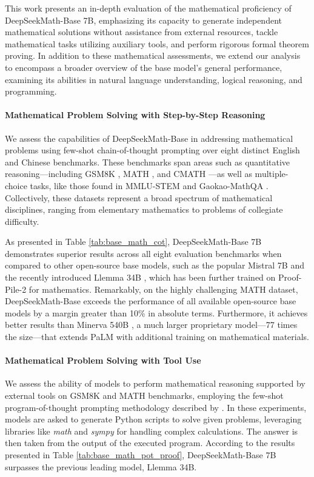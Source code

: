 \begin{itemize}[topsep=0pt]
This work presents an in-depth evaluation of the mathematical proficiency of DeepSeekMath-Base 7B, emphasizing its capacity to generate independent mathematical solutions without assistance from external resources, tackle mathematical tasks utilizing auxiliary tools, and perform rigorous formal theorem proving. In addition to these mathematical assessments, we extend our analysis to encompass a broader overview of the base model’s general performance, examining its abilities in natural language understanding, logical reasoning, and programming.

\paragraph{Mathematical Problem Solving with Step-by-Step Reasoning}

We assess the capabilities of DeepSeekMath-Base in addressing mathematical problems using few-shot chain-of-thought prompting \citep{cot} over eight distinct English and Chinese benchmarks. These benchmarks span areas such as quantitative reasoning—including GSM8K \citep{gsm8k}, MATH \citep{MATH}, and CMATH \citep{wei2023cmath}—as well as multiple-choice tasks, like those found in MMLU-STEM \citep{mmlu} and Gaokao-MathQA \citep{agieval}. Collectively, these datasets represent a broad spectrum of mathematical disciplines, ranging from elementary mathematics to problems of collegiate difficulty.

As presented in Table \ref{tab:base_math_cot}, DeepSeekMath-Base 7B demonstrates superior results across all eight evaluation benchmarks when compared to other open-source base models, such as the popular Mistral 7B \citep{mistral} and the recently introduced Llemma 34B \citep{llemma}, which has been further trained on Proof-Pile-2 \citep{llemma} for mathematics. Remarkably, on the highly challenging MATH dataset, DeepSeekMath-Base exceeds the performance of all available open-source base models by a margin greater than 10\% in absolute terms. Furthermore, it achieves better results than Minerva 540B \citep{minerva}, a much larger proprietary model—77 times the size—that extends PaLM \citep{palm} with additional training on mathematical materials.

\paragraph{Mathematical Problem Solving with Tool Use} We assess the ability of models to perform mathematical reasoning supported by external tools on GSM8K and MATH benchmarks, employing the few-shot program-of-thought prompting methodology described by \citet{pot,pal}. In these experiments, models are asked to generate Python scripts to solve given problems, leveraging libraries like \textit{math} and \textit{sympy} for handling complex calculations. The answer is then taken from the output of the executed program. According to the results presented in Table \ref{tab:base_math_pot_proof}, DeepSeekMath-Base 7B surpasses the previous leading model, Llemma 34B.


\end{itemize}

